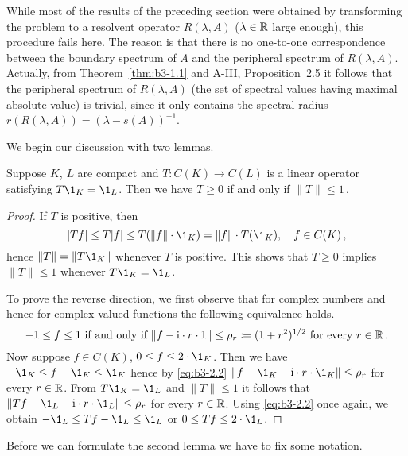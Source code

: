 While most of the results of the preceding section were obtained by transforming the problem to a resolvent operator $R(\lambda,A)$ ($\lambda \in \mathbb{R}$ large enough), this procedure fails here.
The reason is that there is no one-to-one correspondence between the boundary spectrum of $A$ and the peripheral spectrum of $R(\lambda,A)$.
Actually, from Theorem~\ref{thm:b3-1.1} and A-III, Proposition~2.5 it follows that the peripheral spectrum of $R(\lambda,A)$ (\ie the set of spectral values having maximal absolute value) is trivial, since it only contains the spectral radius $r(R(\lambda,A)) = (\lambda - s(A))^{-1}$.

We begin our discussion with two lemmas.
\begin{lemma}\label{lem:b3-2.1}
	Suppose $K$, $L$ are compact and $T \colon C(K) \to C(L)$ is a linear operator satisfying $T \1_{K} = \1_{L}$.
	Then we have $T \geq 0$ if and only if $\|T\| \leq 1$\,.
\end{lemma}
\begin{proof}
	If $T$ is positive, then
	\begin{equation}\label{eq:b3-2.1}
	|Tf| \leq T|f| \leq T(\|f\|\cdot \1_{K}) = \|f\|\cdot T(\1_{K}), \quad f \in C(K)\,,
	\end{equation}
	hence $\|T\| = \|T\1_{K}\|$ whenever $T$ is positive.
	This shows that $T \geq 0$ implies $\|T\| \leq 1$ whenever $T\1_{K} = \1_{L}$.
	
	To prove the reverse direction, we first observe that for complex numbers and hence for complex-valued functions the following equivalence holds.
	\begin{equation}\label{eq:b3-2.2}
	-1 \leq f \leq 1 \text{ if and only if } \|f - \mathrm{i}\cdot r\cdot 1\| \leq \rho_{r} \coloneqq (1+r^{2})^{1/2} \text{ for every } r \in \mathbb{R}\,.
	\end{equation}
	Now suppose $f \in C(K)$, $0 \leq f \leq 2\cdot \1_{K}$.
	Then we have $-\1_{K} \leq f - \1_{K} \leq \1_{K}$ hence by \eqref{eq:b3-2.2} $\|f - \1_{K} - \im\cdot r\cdot \1_{K}\| \leq \rho_{r}$ for every $r \in \mathbb{R}$.
	From $T\1_{K} = \1_{L}$ and $\|T\| \leq 1$ it follows that $\|Tf - \1_{L} - \im\cdot r\cdot \1_{L}\| \leq \rho_{r}$ for every $r \in \mathbb{R}$.
	Using \eqref{eq:b3-2.2} once again, we obtain $-\1_{L} \leq Tf - \1_{L} \leq \1_{L}$ or $0 \leq Tf \leq 2\cdot \1_{L}$.
\end{proof}
Before we can formulate the second lemma we have to fix some notation.
